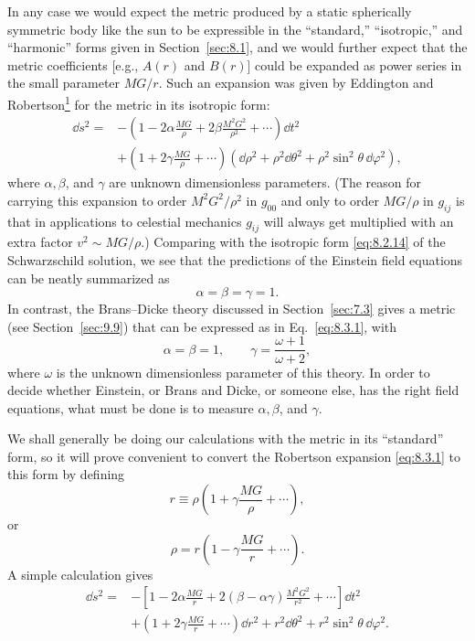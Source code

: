 In any case we would expect the metric produced by a static spherically
symmetric body like the sun to be expressible in the ``standard,''
``isotropic,'' and ``harmonic'' forms given in Section~\ref{sec:8.1}, and
we would further expect that the metric coefficients [e.g., \(A(r)\) and
\(B(r)\)] could be expanded as power series in the small parameter \(MG/r\).
Such an expansion was given by Eddington and
Robertson\hyperref[ch8-ref-1]{\textsuperscript{1}} for the metric in its
isotropic form:
\begin{equation}
  \begin{split}
  \dd s^2={}&
  -\left(
    1-2\alpha\frac{MG}{\rho}
    +2\beta\frac{M^2G^2}{\rho^2}+\cdots
  \right)\dd t^2\\
  &+
  \left(1+2\gamma\frac{MG}{\rho}+\cdots\right)
  \left(\dd\rho^2+\rho^2\dd\theta^2
  +\rho^2\sin^2\theta\,\dd\varphi^2\right),
  \end{split}
  \tag{8.3.1}\label{eq:8.3.1}
\end{equation}
where \(\alpha,\beta\), and \(\gamma\) are unknown dimensionless
parameters. (The reason for carrying this expansion to order
\(M^2G^2/\rho^2\) in \(g_{00}\) and only to order \(MG/\rho\) in
\(g_{ij}\) is that in applications to celestial mechanics \(g_{ij}\) will
always get multiplied with an extra factor \(v^2\sim MG/\rho\).)
Comparing with the isotropic form \eqref{eq:8.2.14} of the Schwarzschild
solution, we see that the predictions of the Einstein field equations can
be neatly summarized as
\begin{equation}
  \alpha=\beta=\gamma=1.
  \tag{8.3.2}\label{eq:8.3.2}
\end{equation}
In contrast, the Brans--Dicke theory discussed in Section~\ref{sec:7.3}
gives a metric (see Section~\ref{sec:9.9}) that can be expressed as in
Eq.~\eqref{eq:8.3.1}, with
\begin{equation}
  \alpha=\beta=1,\qquad
  \gamma=\frac{\omega+1}{\omega+2},
  \tag{8.3.3}\label{eq:8.3.3}
\end{equation}
where \(\omega\) is the unknown dimensionless parameter of this theory. In
order to decide whether Einstein, or Brans and Dicke, or someone else, has
the right field equations, what must be done is to measure
\(\alpha,\beta\), and \(\gamma\).

We shall generally be doing our calculations with the metric in its
``standard'' form, so it will prove convenient to convert the Robertson
expansion \eqref{eq:8.3.1} to this form by defining
\begin{equation}
  r\equiv\rho\left(1+\gamma\frac{MG}{\rho}+\cdots\right),
  \tag{8.3.4}\label{eq:8.3.4}
\end{equation}
or
\[
  \rho=r\left(1-\gamma\frac{MG}{r}+\cdots\right).
\]
A simple calculation gives
\begin{equation}
  \begin{split}
  \dd s^2={}&
  -\left[
    1-2\alpha\frac{MG}{r}
    +2(\beta-\alpha\gamma)\frac{M^2G^2}{r^2}
    +\cdots
  \right]\dd t^2\\
  &+
  \left(1+2\gamma\frac{MG}{r}+\cdots\right)\dd r^2
  +r^2\dd\theta^2+r^2\sin^2\theta\,\dd\varphi^2.
  \end{split}
  \tag{8.3.5}\label{eq:8.3.5}
\end{equation}

